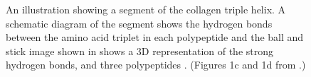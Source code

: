 \begin{figure}[htb]
\centering
{}    
\hspace{20mm}            
\caption{An illustration showing a segment of the collagen triple helix. A schematic diagram of the segment shows the hydrogen bonds between the amino acid triplet in each polypeptide  and the ball and stick image shown in  shows a 3D representation of the strong hydrogen bonds, and three polypeptides \cite{Shoulders2009}. (Figures 1c and 1d from \cite{Shoulders2009}.)} 
\label{fig:collagen_segment}
\end{figure}



